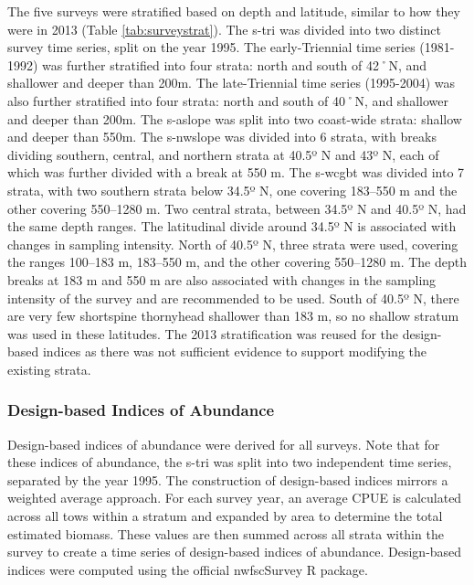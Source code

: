 \documentclass[11pt,
  english,
  letterpaper,
]{article}
\begin{document}
The five surveys were stratified based on depth and latitude, similar to how they were in 2013 (Table \ref{tab:surveystrat}). The \gls{s-tri} was divided into two distinct survey time series, split on the year 1995. The early-Triennial time series (1981-1992) was further stratified into four strata: north and south of 42˚N, and shallower and deeper than 200m. The late-Triennial time series (1995-2004) was also further stratified into four strata: north and south of 40˚N, and shallower and deeper than 200m. The \gls{s-aslope} was split into two coast-wide strata: shallow and deeper than 550m. The \gls{s-nwslope} was divided into 6 strata, with breaks dividing southern, central, and northern strata at 40.5º N and 43º N, each of which was further divided with a break at 550 m. The \gls{s-wcgbt} was divided into 7 strata, with two southern strata below 34.5º N, one covering 183--550 m and the other covering 550--1280 m. Two central strata, between 34.5º N and 40.5º N, had the same depth ranges. The latitudinal divide around 34.5º N is associated with changes in sampling intensity. North of 40.5º N, three strata were used, covering the ranges 100--183 m, 183--550 m, and the other covering 550--1280 m. The depth breaks at 183 m and 550 m are also associated with changes in the sampling intensity of the survey and are recommended to be used. South of 40.5º N, there are very few shortspine thornyhead shallower than 183 m, so no shallow stratum was used in these latitudes. The 2013 stratification was reused for the design-based indices as there was not sufficient evidence to support modifying the existing strata.

\hypertarget{design-based-indices-of-abundance}{%
\subsubsection{Design-based Indices of Abundance}\label{design-based-indices-of-abundance}}

Design-based indices of abundance were derived for all surveys. Note that for these indices of abundance, the \gls{s-tri} was split into two independent time series, separated by the year 1995. The construction of design-based indices mirrors a weighted average approach. For each survey year, an average CPUE is calculated across all tows within a stratum and expanded by area to determine the total estimated biomass. These values are then summed across all strata within the survey to create a time series of design-based indices of abundance. Design-based indices were computed using the official nwfscSurvey R package.
\end{document}
